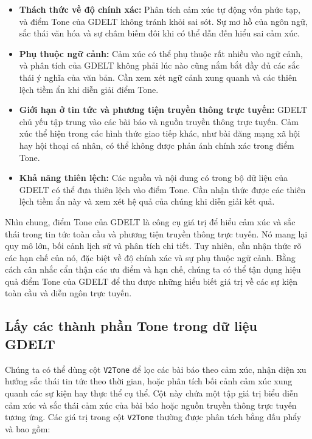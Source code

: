\begin{itemize}
\item
  \textbf{Thách thức về độ chính xác:} Phân tích cảm xúc tự động vốn phức tạp, và điểm Tone của GDELT không tránh khỏi sai sót. Sự mơ hồ của ngôn ngữ, sắc thái văn hóa và sự châm biếm đôi khi có thể dẫn đến hiểu sai cảm xúc.
\item
  \textbf{Phụ thuộc ngữ cảnh:} Cảm xúc có thể phụ thuộc rất nhiều vào ngữ cảnh, và phân tích của GDELT không phải lúc nào cũng nắm bắt đầy đủ các sắc thái ý nghĩa của văn bản. Cần xem xét ngữ cảnh xung quanh và các thiên lệch tiềm ẩn khi diễn giải điểm Tone.
\item
  \textbf{Giới hạn ở tin tức và phương tiện truyền thông trực tuyến:} GDELT chủ yếu tập trung vào các bài báo và nguồn truyền thông trực tuyến. Cảm xúc thể hiện trong các hình thức giao tiếp khác, như bài đăng mạng xã hội hay hội thoại cá nhân, có thể không được phản ánh chính xác trong điểm Tone.
\item
  \textbf{Khả năng thiên lệch:} Các nguồn và nội dung có trong bộ dữ liệu của GDELT có thể đưa thiên lệch vào điểm Tone. Cần nhận thức được các thiên lệch tiềm ẩn này và xem xét hệ quả của chúng khi diễn giải kết quả.
\end{itemize}

Nhìn chung, điểm Tone của GDELT là công cụ giá trị để hiểu cảm xúc và sắc thái trong tin tức toàn cầu và phương tiện truyền thông trực tuyến. Nó mang lại quy mô lớn, bối cảnh lịch sử và phân tích chi tiết. Tuy nhiên, cần nhận thức rõ các hạn chế của nó, đặc biệt về độ chính xác và sự phụ thuộc ngữ cảnh. Bằng cách cân nhắc cẩn thận các ưu điểm và hạn chế, chúng ta có thể tận dụng hiệu quả điểm Tone của GDELT để thu được những hiểu biết giá trị về các sự kiện toàn cầu và diễn ngôn trực tuyến.

\subsection{Lấy các thành phần Tone trong dữ liệu GDELT}

Chúng ta có thể dùng cột \texttt{V2Tone} để lọc các bài báo theo cảm xúc, nhận diện xu hướng sắc thái tin tức theo thời gian, hoặc phân tích bối cảnh cảm xúc xung quanh các sự kiện hay thực thể cụ thể. Cột này chứa một tập giá trị biểu diễn cảm xúc và sắc thái cảm xúc của bài báo hoặc nguồn truyền thông trực tuyến tương ứng. Các giá trị trong cột \texttt{V2Tone} thường được phân tách bằng dấu phẩy và bao gồm:

